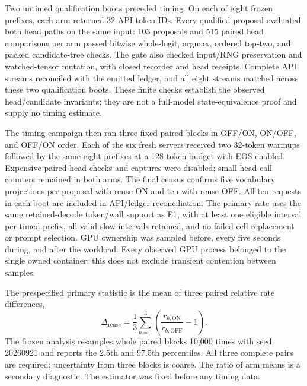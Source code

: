 \documentclass[conference]{IEEEtran}
\begin{document}
Two untimed qualification boots preceded timing. On each of eight frozen prefixes, each arm returned 32 API token IDs. Every qualified proposal evaluated both head paths on the same input: 103 proposals and 515 paired head comparisons per arm passed bitwise whole-logit, argmax, ordered top-two, and packed candidate-tree checks. The gate also checked input/RNG preservation and watched-tensor mutation, with closed recorder and head receipts. Complete API streams reconciled with the emitted ledger, and all eight streams matched across these two qualification boots. These finite checks establish the observed head/candidate invariants; they are not a full-model state-equivalence proof and supply no timing estimate.

The timing campaign then ran three fixed paired blocks in OFF/ON, ON/OFF, and OFF/ON order. Each of the six fresh servers received two 32-token warmups followed by the same eight prefixes at a 128-token budget with EOS enabled. Expensive paired-head checks and captures were disabled; small head-call counters remained in both arms. The final census confirms five vocabulary projections per proposal with reuse ON and ten with reuse OFF. All ten requests in each boot are included in API/ledger reconciliation. The primary rate uses the same retained-decode token/wall support as E1, with at least one eligible interval per timed prefix, all valid slow intervals retained, and no failed-cell replacement or prompt selection. GPU ownership was sampled before, every five seconds during, and after the workload. Every observed GPU process belonged to the single owned container; this does not exclude transient contention between samples.

The prespecified primary statistic is the mean of three paired relative rate differences,
\begin{equation}
 \Delta_{\mathrm{reuse}}=\frac{1}{3}\sum_{b=1}^{3}
 \left(\frac{r_{b,\mathrm{ON}}}{r_{b,\mathrm{OFF}}}-1\right).
\end{equation}
The frozen analysis resamples whole paired blocks 10,000 times with seed 20260921 and reports the 2.5th and 97.5th percentiles. All three complete pairs are required; uncertainty from three blocks is coarse. The ratio of arm means is a secondary diagnostic. The estimator was fixed before any timing data.

\begin{table}[t]
\caption{E8: all three paired B1 blocks. Rates are retained-decode tokens/s for the source-controlled head-reuse comparison. The final ON boot has different continuations and one early EOS; it remains in the primary analysis.}
\label{tab:e8-reuse}
\centering\footnotesize

\end{table}
\end{document}
